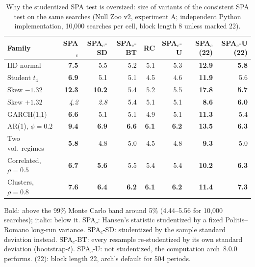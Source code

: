 \begin{table}[t]
\centering
\small
\caption{Why the studentized SPA test is oversized: size of variants of the consistent SPA test on the same searches (Null Zoo v2, experiment A; independent Python implementation, 10,000 searches per cell, block length 8 unless marked 22).}
\label{tab:mechanism}
\begin{tabular}{lrrrrrrr}
\toprule
Family & SPA$_c$ & SPA$_c$-SD & SPA$_c$-BT & RC & SPA$_c$-U & SPA$_c$ (22) & SPA$_c$-U (22) \\
\midrule
IID normal & \textbf{7.5} & 5.5 & 5.2 & 5.1 & 5.3 & \textbf{12.9} & \textbf{5.8} \\
Student $t_4$ & \textbf{6.9} & 5.1 & 5.1 & 4.5 & 4.6 & \textbf{11.9} & 5.6 \\
Skew $-1.32$ & \textbf{12.3} & \textbf{10.2} & 5.4 & 5.2 & 5.5 & \textbf{17.8} & \textbf{5.7} \\
Skew $+1.32$ & \textit{4.2} & \textit{2.8} & 5.4 & 5.1 & 5.1 & \textbf{8.6} & \textbf{6.0} \\
GARCH(1,1) & \textbf{6.6} & 5.1 & 5.1 & 4.9 & 5.1 & \textbf{11.3} & 5.4 \\
AR(1), $\phi=0.2$ & \textbf{9.4} & \textbf{6.9} & \textbf{6.6} & \textbf{6.1} & \textbf{6.2} & \textbf{13.5} & \textbf{6.3} \\
Two vol.\ regimes & \textbf{5.8} & 4.8 & 5.0 & 4.5 & 4.8 & \textbf{9.3} & 5.0 \\
Correlated, $\rho=0.5$ & \textbf{6.7} & \textbf{5.6} & 5.5 & 5.4 & 5.4 & \textbf{10.2} & \textbf{6.3} \\
Clusters, $\rho=0.8$ & \textbf{7.6} & \textbf{6.4} & \textbf{6.2} & \textbf{6.1} & \textbf{6.2} & \textbf{11.4} & \textbf{7.3} \\
\bottomrule
\end{tabular}
\par\smallskip\begin{minipage}{0.97\linewidth}\footnotesize Bold: above the 99\% Monte Carlo band around 5\% (4.44--5.56 for 10,000 searches); italic: below it. SPA$_c$: Hansen's statistic studentized by a fixed Politis--Romano long-run variance. SPA$_c$-SD: studentized by the sample standard deviation instead. SPA$_c$-BT: every resample re-studentized by its own standard deviation (bootstrap-$t$). SPA$_c$-U: not studentized, the computation arch~8.0.0 performs. (22): block length 22, arch's default for 504 periods.\end{minipage}
\end{table}

